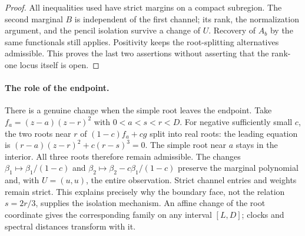 \begin{proof}
All inequalities used have strict margins on a compact subregion.
The second marginal $B$ is independent of the first channel; its rank,
the normalization argument, and the pencil isolation survive a change of
$U$. Recovery of $A_b$ by the same functionals still applies. Positivity
keeps the root-splitting alternatives admissible. This proves the last
two assertions without asserting that the rank-one locus itself is open.
\end{proof}

\paragraph{The role of the endpoint.}
There is a genuine change when the simple root leaves the endpoint.
Take $f_a=(z-a)(z-r)^2$ with $0<a<s<r<D$. For negative sufficiently
small $c$, the two roots near $r$ of $(1-c)f_a+cg$ split into real
roots: the leading equation is
$(r-a)(z-r)^2+c(r-s)^3=0$. The simple root near $a$ stays in the
interior. All three roots therefore remain admissible. The changes
$\beta_1\mapsto\beta_1/(1-c)$ and
$\beta_2\mapsto\beta_2-c\beta_1/(1-c)$ preserve the marginal polynomial
and, with $U=(u,u)$, the entire observation. Strict channel entries and
weights remain strict. This explains precisely why the boundary face,
not the relation $s=2r/3$, supplies the isolation mechanism.
An affine change of the root coordinate gives the corresponding family
on any interval $[L,D]$; clocks and spectral distances transform with it.
